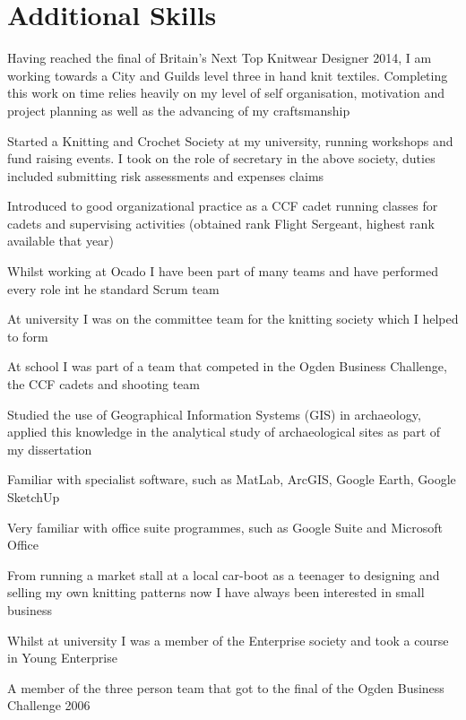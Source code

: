 \documentclass[freya.tex]{subfiles}
\begin{document}
\section{Additional Skills}
\location{}
\begin{tightemize}
\item Having reached the final of Britain's Next Top Knitwear Designer 2014, I am working towards a City and Guilds level three in hand knit textiles.  Completing this work on time relies heavily on my level of self organisation, motivation and project planning as well as the advancing of my craftsmanship
\item Started a Knitting and Crochet Society at my university, running workshops and fund raising events. I took on the role of secretary in the above society, duties included submitting risk assessments and expenses claims
\item Introduced to good organizational practice as a CCF cadet running classes for cadets and supervising activities (obtained rank Flight Sergeant, highest rank available that year)	
\end{tightemize}
\sectionsep
{}\location{}
\begin{tightemize}
\item Whilst working at Ocado I have been part of many teams and have performed every role int he standard Scrum team
\item At university I was on the committee team for the knitting society which I helped to form
\item At school I was part of a team that competed in the Ogden Business Challenge, the CCF cadets and shooting team
\end{tightemize}
\sectionsep
{}\location{}
\begin{tightemize}
\item Studied the use of Geographical Information Systems (GIS) in archaeology, applied this knowledge in the  analytical study of archaeological sites as part of my dissertation  
\item Familiar with specialist software, such as MatLab, ArcGIS, Google Earth, Google SketchUp
\item Very familiar with office suite programmes, such as Google Suite and Microsoft Office
\end{tightemize}
\sectionsep
{}\location{}
\begin{tightemize}
\item From running a market stall at a local car-boot as a teenager to designing and selling my own knitting patterns now I have always been interested in small business
\item Whilst at university I was a member of the Enterprise society and took a course in Young Enterprise
\item A member of the three person team that got to the final of the Ogden Business Challenge 2006
\end{tightemize}\\
\end{document}
